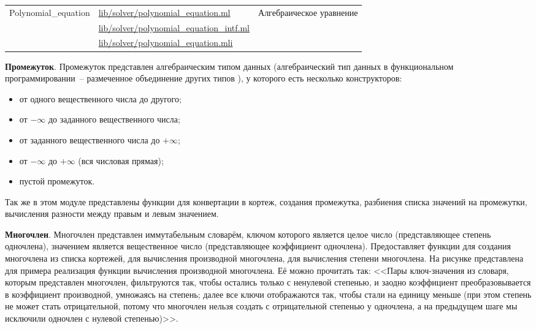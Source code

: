 \begin{centering}
\begin{longtable}{|l|l|l|}
        \multirow{3}{*}{Polynomial\_equation}                 & \href{https://github.com/prekel/chapgame/blob/master/lib/solver/polynomial\_equation.ml}{lib/solver/polynomial\_equation.ml}             & \multirow{3}{3.4cm}{Алгебраическое уравнение} \\\nopagebreak \cline{2-2}
                                                              & \href{https://github.com/prekel/chapgame/blob/master/lib/solver/polynomial\_equation\_intf.ml}{lib/solver/polynomial\_equation\_intf.ml} &                                               \\\nopagebreak \cline{2-2}
                                                              & \href{https://github.com/prekel/chapgame/blob/master/lib/solver/polynomial\_equation.mli}{lib/solver/polynomial\_equation.mli}           &                                               \\ \hline
    \end{longtable}
\end{centering}

\textbf{Промежуток}. Промежуток представлен алгебраическим типом данных
(алгебраический тип данных в функциональном программировании~-- размеченное объединение
других типов \cite{fprog-adt}),
у которого есть несколько конструкторов:

\begin{itemize}
    \item от одного вещественного числа до другого;
    \item от \(-\infty\) до заданного вещественного числа;
    \item от заданного вещественного числа до \(+\infty\);
    \item от \(-\infty\) до \(+\infty\) (вся числовая прямая);
    \item пустой промежуток.
\end{itemize}

Так же в этом модуле представлены функции для конвертации в кортеж, создания промежутка,
разбиения списка значений на промежутки, вычисления разности между правым и левым значением.

\textbf{Многочлен}. Многочлен представлен иммутабельным словарём, ключом которого является целое число (представляющее степень одночлена),
значением является вещественное число (представляющее коэффициент одночлена).
Предоставляет функции для создания многочлена из списка кортежей, для вычисления производной многочлена, для вычисления степени многочлена.
На рисунке \TODO представлена для примера реализация функции вычисления производной многочлена. Её можно прочитать так:
<<Пары ключ-значения из словаря, которым представлен многочлен, фильтруются так, чтобы остались только с ненулевой степенью,
и заодно коэффициент преобразовывается в коэффициент производной, умножаясь на степень; далее все ключи отображаются так, чтобы стали на единицу меньше
(при этом степень не может стать отрицательной, потому что многочлен нельзя создать с отрицательной степенью у одночлена,
а на предыдущем шаге мы исключили одночлен с нулевой степенью)>>.

